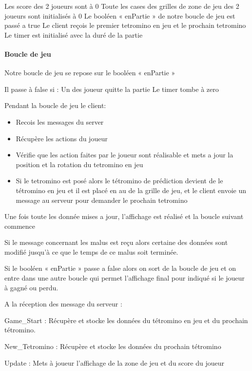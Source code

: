 \documentclass[a4paper, 12pt]{article}
\begin{document}
				Les score des 2 joueurs sont à 0
				Toute les cases des grilles de zone de jeu des 2 joueurs sont initialisés à 0
				Le booléen « enPartie » de notre boucle de jeu est passé a true
				Le client reçois le premier tetromino en jeu et le prochain tetromino
				Le timer est initialisé avec la duré de la partie


			\paragraph{Boucle de jeu}

			Notre boucle de jeu se repose sur le booléen « enPartie »

			Il passe à false si : 
			    Un des joueur quitte la partie
			    Le timer tombe à zero

			Pendant la boucle de jeu le client:

	\begin{itemize}
		\item Recois les messages du server
		\item Récupère les actions du joueur
		\item Vérifie que les action faites par le joueur sont réalisable et mets a jour la position et la rotation du tetromino en jeu
		\item Si le tetromino est posé alors le tétromino de prédiction devient de le tétromino en jeu et il est placé en au de la grille de jeu, et le client envoie un message au serveur pour demander le prochain tetromino
	\end{itemize}

		Une fois toute les donnée mises a jour, l’affichage est réalisé et la boucle suivant commence

		Si le message concernant les malus est reçu alors certaine des données sont modifié jusqu’à ce que le temps de ce malus soit terminée.

		Si le booléen « enPartie » passe a false alors on sort de la boucle de jeu et on entre dans une autre boucle qui permet l’affichage final pour indiqué si le joueur à gagné ou perdu.

		A la réception des message du serveur :

		Game\_Start : 
		    Récupère et stocke les données du tétromino en jeu et du prochain tétromino.

		New\_Tetromino :
		    Récupère et stocke les données du prochain tétromino

		Update : 
		    Mets à joueur l’affichage de la zone de jeu et du score du joueur
\end{document}

